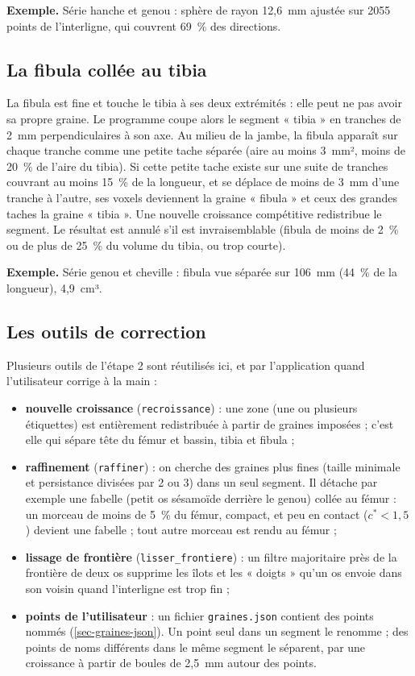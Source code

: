\documentclass[11pt,a4paper]{article}
\newcommand{\fichier}[1]{\texttt{\small #1}}
\begin{document}
\textbf{Exemple.} Série hanche et genou : sphère de rayon 12,6~mm ajustée sur 2055 points de l'interligne, qui
couvrent 69~\% des directions.

\subsection{La fibula collée au tibia}
\label{sec-fibula}

La fibula est fine et touche le tibia à ses deux extrémités : elle peut ne pas avoir sa propre graine. Le programme
coupe alors le segment « tibia » en tranches de 2~mm perpendiculaires à son axe. Au milieu de la jambe, la fibula
apparaît sur chaque tranche comme une petite tache séparée (aire au moins 3~mm², moins de 20~\% de l'aire du tibia).
Si cette petite tache existe sur une suite de tranches couvrant au moins 15~\% de la longueur, et se déplace de moins
de 3~mm d'une tranche à l'autre, ses voxels deviennent la graine « fibula » et ceux des grandes taches la graine
« tibia ». Une nouvelle croissance compétitive redistribue le segment. Le résultat est annulé s'il est invraisemblable
(fibula de moins de 2~\% ou de plus de 25~\% du volume du tibia, ou trop courte).

\textbf{Exemple.} Série genou et cheville : fibula vue séparée sur 106~mm (44~\% de la longueur), 4,9~cm³.

\subsection{Les outils de correction}

Plusieurs outils de l'étape 2 sont réutilisés ici, et par l'application quand l'utilisateur corrige à la main :
\begin{itemize}
  \item \textbf{nouvelle croissance} (\texttt{recroissance}) : une zone (une ou plusieurs étiquettes) est entièrement
  redistribuée à partir de graines imposées ; c'est elle qui sépare tête du fémur et bassin, tibia et fibula ;
  \item \textbf{raffinement} (\texttt{raffiner}) : on cherche des graines plus fines (taille minimale et persistance
  divisées par 2 ou 3) dans un seul segment. Il détache par exemple une fabelle (petit os sésamoïde derrière le genou)
  collée au fémur : un morceau de moins de 5~\% du fémur, compact, et peu en contact ($c^* < 1{,}5$) devient une
  fabelle ; tout autre morceau est rendu au fémur ;
  \item \textbf{lissage de frontière} (\texttt{lisser\_frontiere}) : un filtre majoritaire près de la frontière de
  deux os supprime les îlots et les « doigts » qu'un os envoie dans son voisin quand l'interligne est trop fin ;
  \item \textbf{points de l'utilisateur} : un fichier \fichier{graines.json} contient des points nommés
  (\cref{sec-graines-json}). Un point seul dans un segment le renomme ; des points de noms différents dans le même
  segment le séparent, par une croissance à partir de boules de 2,5~mm autour des points.
\end{itemize}
\end{document}
